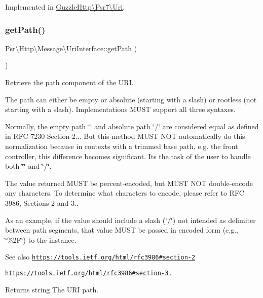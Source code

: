 Implemented in \hyperlink{classGuzzleHttp_1_1Psr7_1_1Uri_a77cd782c426d48880a457a0a54c46d5d}{Guzzle\+Http\textbackslash{}\+Psr7\textbackslash{}\+Uri}.

\mbox{\label{interfacePsr_1_1Http_1_1Message_1_1UriInterface_aa50072ff08f6acf7c35aa5ebd0ae91cd}} 
\subsubsection{\texorpdfstring{get\+Path()}{getPath()}}
{\footnotesize\ttfamily Psr\textbackslash{}\+Http\textbackslash{}\+Message\textbackslash{}\+Uri\+Interface\+::get\+Path (\begin{DoxyParamCaption}{ }\end{DoxyParamCaption})}

Retrieve the path component of the U\+RI.

The path can either be empty or absolute (starting with a slash) or rootless (not starting with a slash). Implementations M\+U\+ST support all three syntaxes.

Normally, the empty path \char`\"{}\char`\"{} and absolute path \char`\"{}/\char`\"{} are considered equal as defined in R\+FC 7230 Section 2... But this method M\+U\+ST N\+OT automatically do this normalization because in contexts with a trimmed base path, e.\+g. the front controller, this difference becomes significant. It\textquotesingle{}s the task of the user to handle both \char`\"{}\char`\"{} and \char`\"{}/\char`\"{}.

The value returned M\+U\+ST be percent-\/encoded, but M\+U\+ST N\+OT double-\/encode any characters. To determine what characters to encode, please refer to R\+FC 3986, Sections 2 and 3..

As an example, if the value should include a slash (\char`\"{}/\char`\"{}) not intended as delimiter between path segments, that value M\+U\+ST be passed in encoded form (e.\+g., \char`\"{}\%2\+F\char`\"{}) to the instance.

\begin{DoxySeeAlso}{See also}
\href{https://tools.ietf.org/html/rfc3986#section-2}{\tt https\+://tools.\+ietf.\+org/html/rfc3986\#section-\/2} 

\href{https://tools.ietf.org/html/rfc3986#section-3.3}{\tt https\+://tools.\+ietf.\+org/html/rfc3986\#section-\/3.} 
\end{DoxySeeAlso}
\begin{DoxyReturn}{Returns}
string The U\+RI path. 
\end{DoxyReturn}


